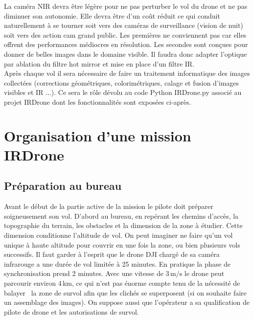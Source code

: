 \documentclass[a4paper,11pt]{report}
\begin{document}
La caméra NIR devra être légère pour ne pas perturber le vol du drone et ne pas diminuer son autonomie. Elle devra être d'un coût réduit ce qui conduit naturellement à se tourner soit vers des caméras de surveillance (\og vision de nuit\fg{}) soit vers des \og action cam \fg{} grand public. Les premières ne conviennent pas car elles offrent des performances médiocres en résolution. Les secondes sont conçues pour donner de belles images dans le domaine visible. Il faudra donc adapter l'optique par ablation du filtre \og hot mirror\fg{} et mise en place d'un filtre IR.  \\


Après chaque vol il sera nécessaire de faire un traitement informatique des images collectées (corrections géométriques, colorimétriques, calage et fusion d'images visibles et IR ...). Ce sera le rôle dévolu au code Python  IRDrone.py associé au projet \textsf{IRDrone} dont les fonctionnalités sont  exposées ci-après.


\section{Organisation d'une mission IRDrone}

\subsection{Préparation au bureau}

Avant le début de la partie active de la mission le pilote doit préparer soigneusement son vol. 
D'abord au bureau, en repérant les chemins d'accès, la topographie du terrain, les obstacles et la dimension de la zone à étudier. 
Cette dimension conditionne l'altitude de vol. On peut imaginer ne faire qu'un vol unique à haute altitude pour couvrir en une fois la zone, ou bien plusieurs vols successifs. Il faut garder à l'esprit que le drone DJI chargé de sa caméra infrarouge a une durée de vol limitée à 25 minutes. 
En pratique la phase de synchronisation prend 2 minutes. Avec une vitesse de $3\,\mathrm{m/s}$ le drone peut parcourir environ 4\,km, ce qui n'est pas énorme compte tenu de la nécessité de \og balayer \fg~la zone de survol afin que les clichés se superposent (si on souhaite faire un assemblage des images). 
On suppose aussi que l'opérateur a sa qualification de pilote de drone et les autorisations de survol.
\end{document}
